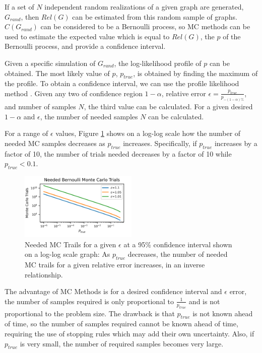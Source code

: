 If a set of \(N\) independent random realizations of a given graph are generated, \(G_{rand}\), then \(Rel(G)\) can be estimated from this random sample of graphs. \(C(G_{rand})\) can be considered to be a Bernoulli process, so MC methods can be used to estimate the expected value which is equal to \(Rel(G)\), the \(p\) of the Bernoulli process, and provide a confidence interval.

Given a specific simulation of \(G_{rand}\), the log-likelihood profile of \(p\) can be obtained. The most likely value of \(p\), \(p_{true}\), is obtained by finding the maximum of the profile. To obtain a confidence interval, we can use the profile likelihood method \cite{venzon1988method}. Given any two of confidence region \(1-\alpha\), relative error \(\epsilon=\frac{p_{true}}{p_{-(1-\alpha)\%}}\), and number of samples \(N\), the third value can be calculated. For a given desired \(1-\alpha\) and \(\epsilon\), the number of needed samples \(N\) can be calculated.

For a range of \(\epsilon\) values, Figure \ref{fig:MC Trial Graph} shows on a log-log scale how the number of needed MC samples decreases as \(p_{true}\) increases. Specifically, if \(p_{true}\) increases by a factor of 10, the number of trials needed decreases by a factor of 10 while \(p_{true}<0.1\).

\begin{figure}[t]
\caption{Needed MC Trails for a given $\epsilon$ at a 95\% confidence interval shown on a log-log scale graph: As $p_{true}$ decreases, the number of needed MC trails for a given relative error increases, in an inverse relationship.}
\label{fig:MC Trial Graph}
\includegraphics[width=0.5\textwidth]{../figures/MCTrials.png}
\end{figure}

The advantage of MC Methods is for a desired confidence interval and \(\epsilon\) error, the number of samples required is only proportional to \(\frac{1}{p_{true}}\) and is not proportional to the problem size. The drawback is that \(p_{true}\) is not known ahead of time, so the number of samples required cannot be known ahead of time, requiring the use of stopping rules which may add their own uncertainty. Also, if \(p_{true}\) is very small, the number of required samples becomes very large.

